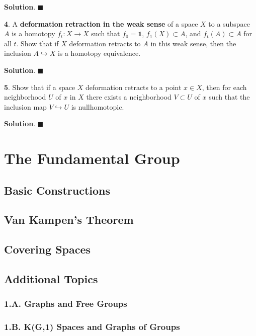 \documentclass{article}
\newcommand{\identity}{\mathds{1}}
\begin{document}
\textbf{Solution}. $\blacksquare$
\bigskip
\bigskip

\textbf{4}. A \textbf{deformation retraction in the weak sense} of a space $X$ to a subspace $A$ is a homotopy $f_{t}: X\to X$ such that $f_{0} = \identity$, $f_{1}(X)\subset A$, and $f_{t}(A)\subset A$ for all $t$. Show that if $X$ deformation retracts to $A$ in this weak sense, then the inclusion $A\hookrightarrow X$ is a homotopy equivalence.
\medskip

\textbf{Solution}. $\blacksquare$
\bigskip
\bigskip

\textbf{5}. Show that if a space $X$ deformation retracts to a point $x\in X$, then for each neighborhood $U$ of $x$ in $X$ there exists a neighborhood $V\subset U$ of $x$ such that the inclusion map $V\hookrightarrow U$ is nullhomotopic.
\medskip

\textbf{Solution}. $\blacksquare$
\newpage

\section{The Fundamental Group}

\subsection{Basic Constructions}

\subsection{Van Kampen's Theorem}

\subsection{Covering Spaces}

\subsection*{Additional Topics}

\subsubsection*{1.A. Graphs and Free Groups}

\subsubsection*{1.B. K(G,1) Spaces and Graphs of Groups}
\end{document}
